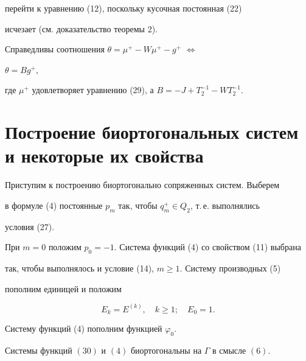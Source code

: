 перейти к уравнению (12), поскольку кусочная постоянная (22) 


исчезает (см. доказательство теоремы 2). 


 


 


\begin{cor} 


Справедливы соотношения $\theta=\mu^+-W\mu^+-g^+$ $\Leftrightarrow$ 


$\theta=Bg^+$, 


где $\mu^+$ удовлетворяет уравнению (29), а $B=-J+T^{-1}_2-WT^{-1}_2$. 


\end{cor} 


 


 


\section{Построение биортогональных систем и некоторые их свойства} 


 


 


Приступим к построению биортогонально сопряженных систем. Выберем 


в формуле (4) постоянные $p_m$ так, чтобы $q^+_m\in Q_2$, т.\,е. выполнялись 


условия (27). 


При $m=0$ положим $p_0=-1$. Система функций (4) со свойством (11) выбрана 


так, чтобы выполнялось и условие (14), $m\ge1$. Систему производных (5) 


пополним единицей и положим 


\begin{equation} 


E_k=E^{(k)},\quad k\ge1;\quad E_0=1. 


\end{equation} 


Систему функций (4) пополним функцией $\varphi_0$. 


 


 


\begin{thm} 


Системы функций $(30)$ и $(4)$ биортогональны на $\Gamma$ в смысле $(6)$. 


\end{thm} 


